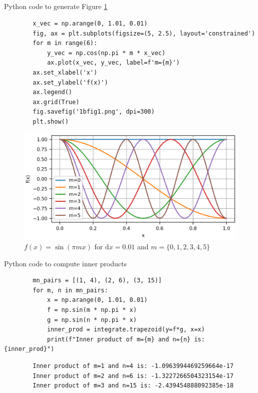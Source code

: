 \documentclass[11pt]{article}
\begin{document}
\subsection{} %
\begin{listing}[H]
    \caption{Python code to generate Figure \ref{1bfig1}}
    \label{1blst1}
    \begin{verbatim}
        x_vec = np.arange(0, 1.01, 0.01)
        fig, ax = plt.subplots(figsize=(5, 2.5), layout='constrained')
        for m in range(6):
            y_vec = np.cos(np.pi * m * x_vec)
            ax.plot(x_vec, y_vec, label=f'm={m}')
        ax.set_xlabel('x')
        ax.set_ylabel('f(x)')
        ax.legend()
        ax.grid(True)
        fig.savefig('1bfig1.png', dpi=300)
        plt.show()
    \end{verbatim}
\end{listing}
\begin{figure}[H]
    \centering
    \includegraphics[width=5in]{1bfig1.png}
    \caption{$f(x) = \sin(\pi m x)$ for $\mathrm{d}x=0.01$ and $m=\{0, 1, 2, 3, 4, 5\}$}
    \label{1bfig1}
\end{figure}

\begin{listing}[H]
    \caption{Python code to compute inner products}
    \label{1blst2}
    \begin{verbatim}
        mn_pairs = [(1, 4), (2, 6), (3, 15)]
        for m, n in mn_pairs:
            x = np.arange(0, 1.01, 0.01)
            f = np.sin(m * np.pi * x)
            g = np.sin(n * np.pi * x)
            inner_prod = integrate.trapezoid(y=f*g, x=x)
            print(f"Inner product of m={m} and n={n} is: {inner_prod}")
    \end{verbatim}
    \begin{verbatim}
        Inner product of m=1 and n=4 is: -1.0963994469259664e-17
        Inner product of m=2 and n=6 is: -1.3227266504323154e-17
        Inner product of m=3 and n=15 is: -2.439454888092385e-18
    \end{verbatim}
\end{listing}
\end{document}
